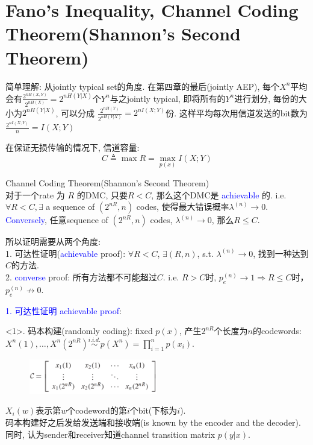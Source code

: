 \section{Fano's Inequality, Channel Coding Theorem(Shannon's Second Theorem)}
简单理解: 从jointly typical set的角度. 在第四章的最后(jointly AEP), 每个$X^n$平均会有$\frac{2^{nH(X,Y)}}{2^{nH(X)}}=2^{nH(Y|X)}$个$Y^n$与之jointly typical, 即将所有的$Y^n$进行划分, 每份的大小为$2^{nH(Y|X)}$, 可以分成 $\frac{2^{nH(Y)}}{2^{nH(Y|X)}}=2^{nI(X;Y)}$份. 这样平均每次用信道发送的bit数为$\frac{2^{nI(X;Y)}}{n}=I(X;Y)$

在保证无损传输的情况下, 信道容量:
$$C\triangleq\max R=\max\limits_{p(x)}I(X;Y)$$

\begin{definition}
Channel Coding Theorem(Shannon's Second Theorem) \\
对于一个rate 为 $R$ 的DMC, 只要$R<C$, 那么这个DMC是 \textcolor{blue}{achievable} 的. i.e. $\forall R<C, \exists$ a sequence of $\left(2^{nR},n\right)$ codes, 使得最大错误概率$\lambda^{(n)}\to 0$. \\
\textcolor{blue}{Conversely}, 任意sequence of $\left(2^{nR},n\right)$ codes, $\lambda^{(n)}\to 0$, 那么$R\leq C$.
\end{definition}
所以证明需要从两个角度: \\
1. 可达性证明(\textcolor{blue}{achievable} proof): $\forall R<C$, $\exists (R,n)$, s.t. $\lambda^{(n)}\to 0$, 找到一种达到$C$的方法. \\
2. \textcolor{blue}{converse} proof: 所有方法都不可能超过$C$. i.e. $R>C$时, $p_e^{(n)}\to 1 \Rightarrow R\leq C$时， $p_e^{(n)}\not\to 0$.


\textcolor{blue}{1. 可达性证明 achievable proof}:

<1>. 码本构建(randomly coding): fixed $p(x)$, 产生$2^{nR}$个长度为$n$的codewords: $X^n(1),\ldots,X^n(2^{nR})\stackrel{i.i.d.}{\sim}p(X^n)=\prod\limits_{i=1}^np(x_i)$.
\begin{figure}[htbp]
    \centering
    \includegraphics[width=0.5\textwidth]{./figures/chapter5/codebook.png}
\end{figure}

$X_i(w)$表示第$w$个codeword的第$i$个bit(下标为$i$). \\
码本构建好之后发给发送端和接收端(is known by the encoder and the decoder). 同时, 认为sender和receiver知道channel transition matrix $p(y|x)$.


